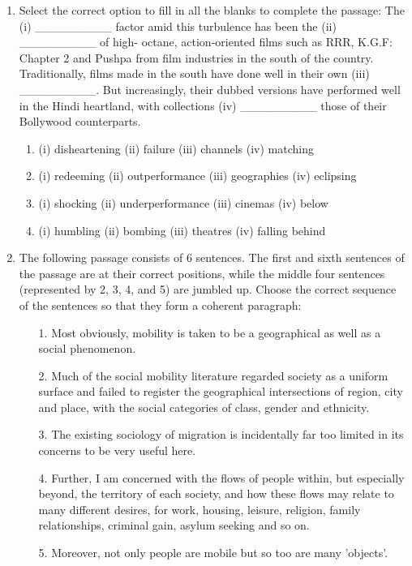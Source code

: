 \documentclass[12pt]{article}
\theoremstyle{remark}
\begin{document}
\begin{enumerate}
\hfill{}
\item Select the correct option to fill in all the blanks to complete the passage: 
The (i) \_\_\_\_\_\_\_\_\_ factor amid this turbulence has been the (ii) \_\_\_\_\_\_\_\_\_ of high-
octane, action-oriented films such as RRR, K.G.F: Chapter 2 and Pushpa from film
industries in the south of the country. Traditionally, films made in the south have
done well in their own (iii) \_\_\_\_\_\_\_\_\_. But increasingly, their dubbed versions
have performed well in the Hindi heartland, with collections (iv) \_\_\_\_\_\_\_\_\_ those of
their Bollywood counterparts. 
\begin{enumerate} 
\item (i) disheartening (ii) failure (iii) channels (iv) matching 
\item (i) redeeming (ii) outperformance (iii) geographies (iv) eclipsing 
\item (i) shocking (ii) underperformance (iii) cinemas (iv) below 
\item (i) humbling (ii) bombing (iii) theatres (iv) falling behind 
\end{enumerate}
\hfill{}
\item The following passage consists of 6 sentences. The first and sixth sentences of the
passage are at their correct positions, while the middle four sentences (represented
by 2, 3, 4, and 5) are jumbled up. 
Choose the correct sequence of the sentences so that they form a coherent
paragraph: 
\begin{enumerate}
\item[1.] Most obviously, mobility is taken to be a geographical as well as a social
phenomenon. 
\item[2.] Much of the social mobility literature regarded society as a uniform surface and
failed to register the geographical intersections of region, city and place, with
the social categories of class, gender and ethnicity. 
\item[3.] The existing sociology of migration is incidentally far too limited in its concerns
to be very useful here. 
\item[4.] Further, I am concerned with the flows of people within, but especially beyond,
the territory of each society, and how these flows may relate to many different
desires, for work, housing, leisure, religion, family relationships, criminal gain,
asylum seeking and so on. 
\item[5.] Moreover, not only people are mobile but so too are many 'objects'. 

\end{enumerate}
\end{enumerate}
\end{document}
